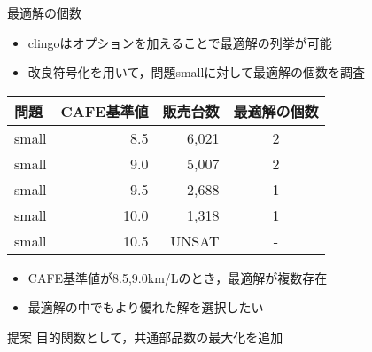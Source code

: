 \documentclass[dvipdfmx, 11pt,]{beamer}
\begin{document}
\begin{frame}{最適解の個数}
 \begin{itemize}
  \item clingoはオプションを加えることで最適解の列挙が可能
  \item 改良符号化を用いて，問題smallに対して最適解の個数を調査
 \end{itemize}

 \begin{exampleblock}{}\centering
  \begin{tabular}{l|r|r|c}
   問題 & CAFE基準値 & 販売台数 & 最適解の個数 \\ \hline
   small & 8.5   & 6,021 & \alert{2} \\ 
   small & 9.0   & 5,007 & \alert{2} \\
   small & 9.5   & 2,688 & 1 \\
   small & 10.0  & 1,318 & 1 \\
   small & 10.5  & UNSAT & - \\ 
  \end{tabular}
 \end{exampleblock}
 \begin{itemize}
  \item CAFE基準値が8.5,9.0km/Lのとき，最適解が複数存在 
  \item 最適解の中でもより優れた解を選択したい
 \end{itemize}

 \begin{alertblock}{提案}
  目的関数として，共通部品数の最大化を追加
 \end{alertblock}
\end{frame}
\end{document}
